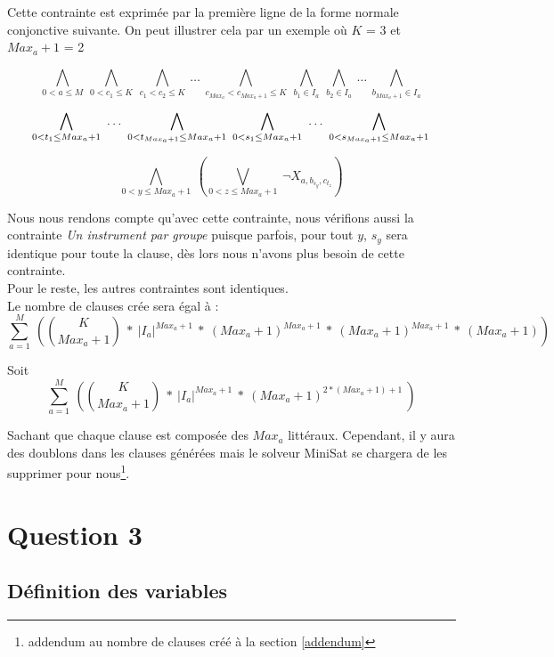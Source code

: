 \documentclass[11pt]{article}
\begin{document}
Cette contrainte est exprimée par la première ligne de la forme normale conjonctive suivante. On peut illustrer cela par un exemple où $K$ = 3 et $Max_a+1$ = 2

$$\bigwedge\limits_{0<a\le M}\ \bigwedge\limits_{0<c_1\le K}\ \bigwedge\limits_{c_1<c_2\le K}\ \ldots\ \bigwedge\limits_{c_{{Max_a}}<c_{Max_{a}+1}\le K}\ \bigwedge\limits_{b_1 \in I_a}\ \bigwedge\limits_{b_2 \in I_a}\ \ldots\  \bigwedge\limits_{b_{Max_a+1} \in I_a} $$

$$ \bigwedge\limits_{0<t_{1}\le Max_a+1}\  \ldots\  \bigwedge\limits_{0<t_{Max_a+1}\le Max_a+1}\ \bigwedge\limits_{0<s_1\le Max_a+1}\  \ldots\  \bigwedge\limits_{0<s_{Max_a+1}\le Max_a+1}\\$$

$$ \bigwedge\limits_{0<y\le Max_a+1}\  \left( \bigvee\limits_{0<z\le Max_a+1}\  \neg X_{a,b_{s_{y}},c_{t_{z}}}\right)$$

Nous nous rendons compte qu'avec cette contrainte, nous vérifions aussi la contrainte \textsl{Un instrument par groupe} puisque parfois, pour tout $y$, $s_y$ sera identique pour toute la clause, dès lors nous n'avons plus besoin de cette contrainte.\\
Pour le reste, les autres contraintes sont identiques.\\

Le nombre de clauses crée sera égal à : \\

$$\sum_{a=1}^{M}\ \left( {K \choose Max_a+1}\ * \ |I_a|^{Max_a+1}\ *\ \left(Max_a+1\right)^{Max_a+1}\ *\ \left(Max_a+1\right)^{Max_a+1}\ *\  \left(Max_a+1\right) \right) $$

Soit\\

$$\sum_{a=1}^{M}\ \left( {K \choose Max_a+1}\ * \ |I_a|^{Max_a+1}\ *\ \left(Max_a+1\right)^{2*(Max_a+1)+1}\ \right) $$

Sachant que chaque clause est composée des $Max_a$ littéraux. 
Cependant, il y aura des doublons dans les clauses générées mais le solveur MiniSat se chargera de les supprimer pour nous\footnote{addendum au nombre de clauses créé à la section \ref{addendum}}.

\section{Question 3}

\subsection{Définition des variables}
\end{document}
